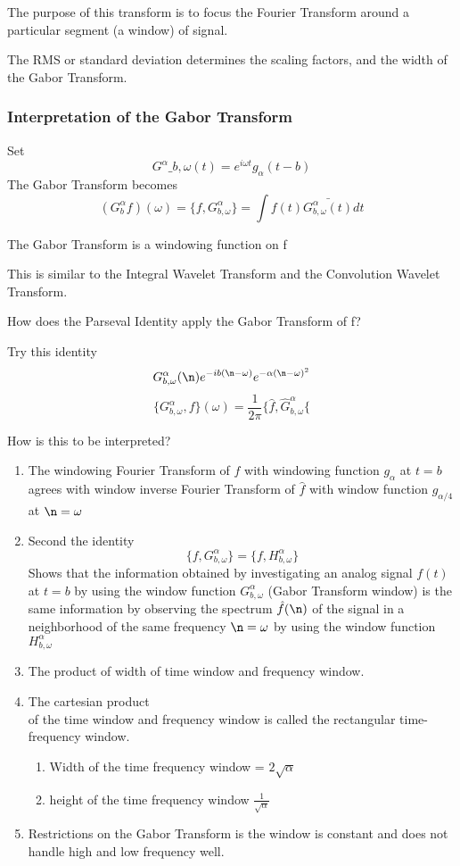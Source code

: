 \documentclass[11pt]{article}
\begin{document}
The purpose of this transform is to focus the Fourier Transform around a particular segment (a window) of signal.

The RMS or standard deviation determines the scaling factors, and the width of the Gabor Transform.
\subsubsection {Interpretation of the Gabor Transform}
Set \[G^\alpha \_{b,\omega} (t) = e^{i\omega t} g_\alpha (t-b)\] 
The Gabor Transform becomes 
\[ (G^\alpha _b f) (\omega) = \lbrace f, G^\alpha _{b, \omega} \rbrace = \int f(t) \bar{G^\alpha _{b,\omega} (t)} dt \]

The Gabor Transform is a windowing function on f

This is similar to the Integral Wavelet Transform and the Convolution Wavelet Transform.

How does the Parseval Identity apply the Gabor Transform of f?

Try this identity
\[  G^\alpha _{b , \omega } (\n)  e^{-ib(\n -\omega)} e^{-\alpha(\n -\omega)^2}  \]
\[ \lbrace G^\alpha _{b , \omega },  f \rbrace (\omega) = \frac {1}{2\pi} \lbrace \hat{f} , \hat{G} ^\alpha _{b,\omega} \lbrace\]

How is this to be interpreted?  
\begin{enumerate}
\item The windowing Fourier Transform of $f$ with windowing function $g_\alpha$ at $t=b$ agrees with window inverse Fourier Transform of $\hat{f}$ with window function $g_{\alpha / 4}$ at $\n = \omega$
\item Second the identity 
\[\lbrace f, G^\alpha _{b, \omega} \rbrace = \lbrace f, H^\alpha _{b, \omega} \rbrace \]
Shows that the information obtained by investigating an analog signal $f(t) $ at $t=b$ by using the window function $G^\alpha _{b,\omega}$ (Gabor Transform window) is the same information by observing the spectrum $\hat{f} (\n)$ of the signal in a neighborhood of the same frequency $\n = \omega$ by using the window function $H^\alpha _{b,\omega}$ 
\item The product of width of time window and frequency window.
\item The cartesian product
\[ \]  %
of the time window and frequency window is called the rectangular time-frequency window.
\begin{enumerate}
\item Width of the time frequency window = $2\sqrt{\alpha}$
\item height of the time frequency window $\frac{1}{\sqrt{\alpha}}$
\end{enumerate}
\item Restrictions on the Gabor Transform is the window is constant and does not handle high and low frequency well.

\end{enumerate}
\end{document}
